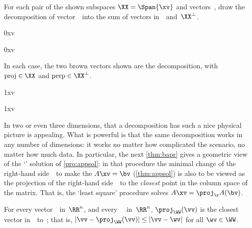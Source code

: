 \begin{reduce}
\begin{example} 
For each pair of the shown subspaces \(\XX=\Span\{\xv\}\) and  vectors~\vv, draw the decomposition of vector~\vv\ into the sum of vectors in~\XX\ and~\(\XX^\perp\).
\begin{Parts}
\item {}0xv
\item {}0xv
\end{Parts}
\begin{solution} 
In each case, the two brown vectors shown are the decomposition, with \(\text{proj}\in\XX\) and \(\text{perp}\in\XX^\perp\).
\begin{Parts}
\item {}1xv
\item {}1xv
\end{Parts} 
\end{solution}
\end{example}

In two or even three dimensions, that a decomposition has such a nice physical picture is appealing.
What is powerful is that the same decomposition works in any number of dimensions: it works no matter how complicated the scenario, no matter how much data.
In particular, the next \cref{thm:bapr} gives a geometric view of the `' solution of \autoref{pro:appsol}: 
in that procedure the minimal change of the right-hand side~\bv\ to make the  \(A\xv=\bv\)  (\autoref{thm:appsol}) is also to be viewed as the projection of the right-hand side~\bv\ to the \emph{closest} point in the column space of the matrix.
That is, the `least square' procedure solves \(A\xv=\proj_\AA(\bv)\).

\begin{theorem} \label{thm:bapr}
For every vector~\vv\ in~\(\RR^n\), and every ~\WW\ in~\(\RR^n\),  \(\proj_\WW(\vv)\) is the closest vector in~\WW\ to~\vv; that is,  \(|\vv-\proj_\WW(\vv)|\leq|\vv-\wv|\) for all \(\wv\in\WW\).\end{theorem}


\end{reduce}
